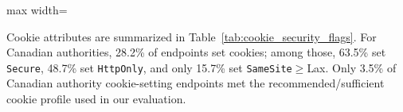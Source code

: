 \documentclass[conference]{IEEEtran}
\begin{document}
\begin{table}[t]
  \caption{Security header adoption by dataset (percent of final URIs).}
  \label{tab:security_headers_presence}
  \centering
  \scriptsize
  \setlength{\tabcolsep}{2.2pt}
  \renewcommand{\arraystretch}{1.15}

  \begin{adjustbox}{max width=\columnwidth}
  \end{adjustbox}
  \end{table}

Cookie attributes are summarized in Table~\ref{tab:cookie_security_flags}. For Canadian authorities, 28.2\% of endpoints set cookies; among those, 63.5\% set \texttt{Secure}, 48.7\% set \texttt{HttpOnly}, and only 15.7\% set \texttt{SameSite}$\ge$Lax. 
Only 3.5\% of Canadian authority cookie-setting endpoints met the recommended/sufficient cookie profile used in our evaluation. 
\end{document}
